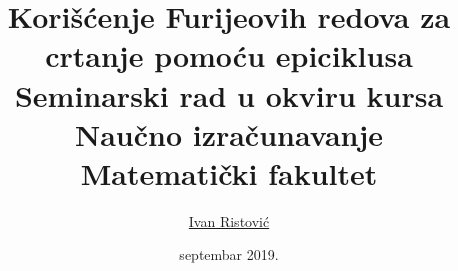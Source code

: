 \documentclass[a4paper]{article}
\theoremstyle{plain}
\theoremstyle{definition}
\begin{document}
\title{Korišćenje Furijeovih redova za crtanje pomoću epiciklusa\\ \small{Seminarski rad u okviru kursa\\Nau\v{c}no izra\v{c}unavanje\\ Matematički fakultet}}

\author{\href{mailto:ivan_ristovic@math.rs}{Ivan Ristovi\'c}}
\date{septembar 2019.}

\maketitle



\tableofcontents

\newpage








\newpage

\begin{appendices}

\end{appendices}
\end{document}
